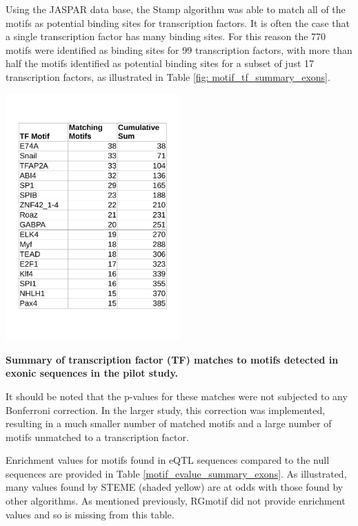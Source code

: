 \documentclass[12pt]{article}
\begin{document}
Using the JASPAR data base, the Stamp algorithm was able to match all of the motifs as potential binding sites for transcription factors. It is often the case that a single transcription factor has many binding sites. For this reason the 770 motifs were identified as binding sites for 99 transcription factors, with more than half the motifs identified as potential binding sites for a subset of just 17 transcription factors, as illustrated in Table \ref{fig: motif_tf_summary_exons}. 

\begin{table}[!htbp]
    \centering
     \includegraphics[width= 0.5\textwidth]{table4_study.pdf} 
    \caption{{\bf Summary of transcription factor (TF) matches to motifs detected in exonic sequences in the pilot study.}}
    \label{fig: motif_tf_summary_exons}
\end{table}
 
It should be noted that the p-values for these matches were not subjected to any Bonferroni correction. In the larger study, this correction was implemented, resulting in a much smaller number of matched motifs and a large number of motifs unmatched to a transcription factor.

Enrichment values for motifs found in eQTL sequences compared to the null sequences are provided in Table \ref{motif_evalue_summary_exons}. As illustrated, many values found by STEME (shaded yellow) are at odds with those found by other algorithms. As mentioned previously, RGmotif did not provide enrichment values and so is missing from this table. 
\end{document}
